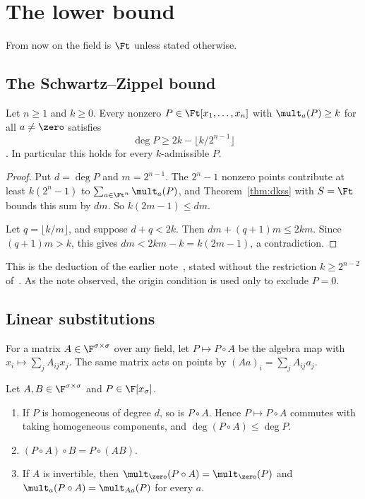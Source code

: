 \section{The lower bound}\label{sec:lower}

From now on the field is \(\Ft\) unless stated otherwise.

\subsection{The Schwartz--Zippel bound}

\begin{proposition}\label{prop:cover-bound}
Let \(n\ge1\) and \(k\ge0\). Every nonzero \(P\in\Ft[x_1,\ldots,x_n]\) with
\(\mult_a(P)\ge k\) for all \(a\ne\zero\) satisfies
\[
 \deg P\ge2k-\lfloor k/2^{n-1}\rfloor
\]
.
In particular this holds for every \(k\)-admissible \(P\).
\end{proposition}

\begin{proof}
Put \(d=\deg P\) and \(m=2^{n-1}\). The \(2^n-1\) nonzero points contribute at least
\(k(2^n-1)\) to \(\sum_{a\in\Ft^n}\mult_a(P)\), and Theorem~\ref{thm:dkss} with
\(S=\Ft\) bounds this sum by \(dm\). So \(k(2m-1)\le dm\).

Let \(q=\lfloor k/m\rfloor\), and suppose \(d+q<2k\). Then
\(dm+(q+1)m\le2km\). Since \((q+1)m>k\), this gives \(dm<2km-k=k(2m-1)\), a
contradiction.
\end{proof}

This is the deduction of the earlier note~\cite{Note}, stated without the
restriction \(k\ge2^{n-2}\) of~\cite[Question~4.3]{BBDM23}. As the note
observed, the origin condition is used only to exclude \(P=0\).

\subsection{Linear substitutions}

For a matrix \(A\in\F^{\sigma\times\sigma}\) over any field, let \(P\mapsto P\circ A\) be
the algebra map with \(x_i\mapsto\sum_jA_{ij}x_j\). The same matrix acts on
points by \((Aa)_i=\sum_jA_{ij}a_j\).

\begin{lemma}\label{lem:subst}
Let \(A,B\in\F^{\sigma\times\sigma}\) and \(P\in\F[x_\sigma]\).
\begin{enumerate}
 \item If \(P\) is homogeneous of degree \(d\), so is \(P\circ A\). Hence
 \(P\mapsto P\circ A\) commutes with taking homogeneous components, and
 \(\deg(P\circ A)\le\deg P\).
 \item \((P\circ A)\circ B=P\circ(AB)\).
 \item If \(A\) is invertible, then \(\mult_{\zero}(P\circ A)=\mult_{\zero}(P)\) and
 \(\mult_a(P\circ A)=\mult_{Aa}(P)\) for every \(a\).
\end{enumerate}
\end{lemma}

